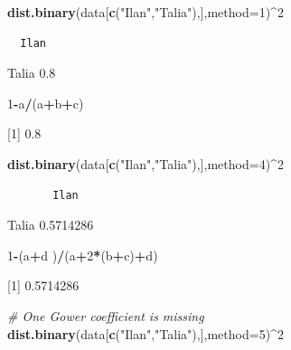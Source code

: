 \documentclass[
]{article}
\newenvironment{Shaded}{\begin{snugshade}}{\end{snugshade}}
\newcommand{\CommentTok}[1]{\textcolor[rgb]{0.56,0.35,0.01}{\textit{#1}}}
\newcommand{\DataTypeTok}[1]{\textcolor[rgb]{0.13,0.29,0.53}{#1}}
\newcommand{\DecValTok}[1]{\textcolor[rgb]{0.00,0.00,0.81}{#1}}
\newcommand{\KeywordTok}[1]{\textcolor[rgb]{0.13,0.29,0.53}{\textbf{#1}}}
\newcommand{\NormalTok}[1]{#1}
\newcommand{\OperatorTok}[1]{\textcolor[rgb]{0.81,0.36,0.00}{\textbf{#1}}}
\newcommand{\StringTok}[1]{\textcolor[rgb]{0.31,0.60,0.02}{#1}}
\begin{document}
\begin{Shaded}
\begin{Highlighting}[]
\KeywordTok{dist.binary}\NormalTok{(data[}\KeywordTok{c}\NormalTok{(}\StringTok{"Ilan"}\NormalTok{,}\StringTok{"Talia"}\NormalTok{),],}\DataTypeTok{method=}\DecValTok{1}\NormalTok{)}\OperatorTok{^}\DecValTok{2}
\end{Highlighting}
\end{Shaded}

\begin{verbatim}
  Ilan
\end{verbatim}

Talia 0.8

\begin{Shaded}
\begin{Highlighting}[]
\DecValTok{1}\OperatorTok{-}\NormalTok{a}\OperatorTok{/}\NormalTok{(a}\OperatorTok{+}\NormalTok{b}\OperatorTok{+}\NormalTok{c)}
\end{Highlighting}
\end{Shaded}

{[}1{]} 0.8

\begin{Shaded}
\begin{Highlighting}[]
\KeywordTok{dist.binary}\NormalTok{(data[}\KeywordTok{c}\NormalTok{(}\StringTok{"Ilan"}\NormalTok{,}\StringTok{"Talia"}\NormalTok{),],}\DataTypeTok{method=}\DecValTok{4}\NormalTok{)}\OperatorTok{^}\DecValTok{2}
\end{Highlighting}
\end{Shaded}

\begin{verbatim}
       Ilan
\end{verbatim}

Talia 0.5714286

\begin{Shaded}
\begin{Highlighting}[]
\DecValTok{1}\OperatorTok{-}\NormalTok{(a}\OperatorTok{+}\NormalTok{d )}\OperatorTok{/}\NormalTok{(a}\OperatorTok{+}\DecValTok{2}\OperatorTok{*}\NormalTok{(b}\OperatorTok{+}\NormalTok{c)}\OperatorTok{+}\NormalTok{d)}
\end{Highlighting}
\end{Shaded}

{[}1{]} 0.5714286

\begin{Shaded}
\begin{Highlighting}[]
\CommentTok{# One Gower coefficient is missing}
\KeywordTok{dist.binary}\NormalTok{(data[}\KeywordTok{c}\NormalTok{(}\StringTok{"Ilan"}\NormalTok{,}\StringTok{"Talia"}\NormalTok{),],}\DataTypeTok{method=}\DecValTok{5}\NormalTok{)}\OperatorTok{^}\DecValTok{2}
\end{Highlighting}
\end{Shaded}
\end{document}
